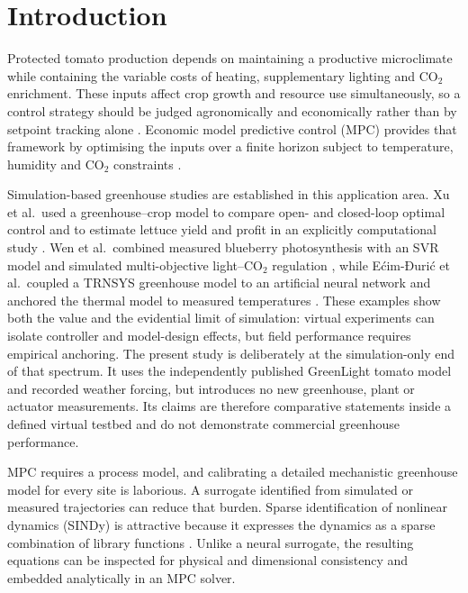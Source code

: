 
\section{Introduction}
\label{sec:intro}

Protected tomato production depends on maintaining a productive microclimate while
containing the variable costs of heating, supplementary lighting and CO$_2$ enrichment.
These inputs affect crop growth and resource use simultaneously, so a control strategy
should be judged agronomically and economically rather than by setpoint tracking alone
\cite{katzin2020,katzin2021}. Economic model predictive control (MPC) provides that
framework by optimising the inputs over a finite horizon subject to temperature, humidity
and CO$_2$ constraints \cite{vanhenten1994,mayne2000,rawlings2012,lin2021}.

Simulation-based greenhouse studies are established in this application area. Xu et al.\
used a greenhouse--crop model to compare open- and closed-loop optimal control and to
estimate lettuce yield and profit in an explicitly computational study
\cite{xu2023agronomy}. Wen et al.\ combined measured blueberry photosynthesis with an SVR
model and simulated multi-objective light--CO$_2$ regulation
\cite{wen2022agronomy}, while E{\'c}im-Đuri{\'c} et al.\ coupled a TRNSYS greenhouse
model to an artificial neural network and anchored the thermal model to measured
temperatures \cite{ecimduric2024}. These examples show both the value and the evidential
limit of simulation: virtual experiments can isolate controller and model-design effects,
but field performance requires empirical anchoring. The present study is deliberately at
the simulation-only end of that spectrum. It uses the independently published GreenLight
tomato model and recorded weather forcing, but introduces no new greenhouse, plant or
actuator measurements. Its claims are therefore comparative statements inside a defined
virtual testbed and do not demonstrate commercial greenhouse performance.

MPC requires a process model, and calibrating a detailed mechanistic greenhouse model for
every site is laborious. A surrogate identified from simulated or measured trajectories
can reduce that burden. Sparse identification of nonlinear dynamics (SINDy) is attractive
because it expresses the dynamics as a sparse combination of library functions
\cite{brunton2016,brunton2016c,kaiser2018,fasel2022}. Unlike a neural surrogate, the
resulting equations can be inspected for physical and dimensional consistency and embedded
analytically in an MPC solver.

